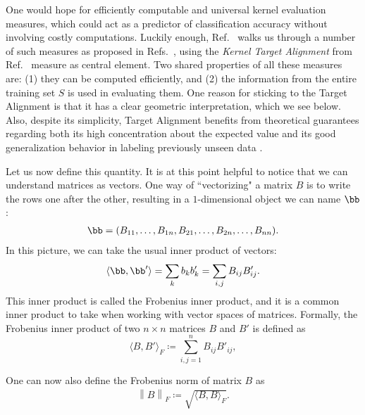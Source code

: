 \documentclass[twocolumn,superscriptaddress,nofootinbib]{revtex4-2}
\newcommand{\Norm}[1]{\left\lVert #1 \right\rVert}
\begin{document}
    One would hope for efficiently computable and universal kernel evaluation measures, which could act as a predictor of classification accuracy without involving costly computations.
    Luckily enough, Ref.~\cite{wangOverviewKernelAlignment2015} walks us through a number of such measures as proposed in  Refs.~\cite{cortes2012CenteredAlignment, baramLearningPolarization, wang2009LocalKernelPolarization, Wang2008KernelClassSeparability, xiong2005EmpiricalFeatureSpace, nguyen2008kernelmatrixevaluationmeasure}, using the \emph{Kernel Target Alignment} from Ref.~\cite{cristianiniKernelTargetAlignment2006} measure as central element.
    Two shared properties of all these measures are: (1) they can be computed efficiently, and (2) the information from the entire training set $S$ is used in evaluating them.
    One reason for sticking to the Target Alignment is that it has a clear geometric interpretation, which we see below.
    Also, despite its simplicity, Target Alignment benefits from theoretical guarantees regarding both its high concentration about the expected value and its good generalization behavior in labeling previously unseen data \cite{cristianiniKernelTargetAlignment2006, kandola2002optimizingalignmentcombinations,nguyen2008kernelmatrixevaluationmeasure}.
    
    Let us now define this quantity.
    It is at this point helpful to notice that we can understand matrices as vectors.
    One way of ``vectorizing" a matrix $B$ is to write the rows one after the other, resulting in a $1$-dimensional object we can name $\bb$:
    \begin{align}
        \bb = (B_{11},\ldots,B_{1n},B_{21},\ldots,B_{2n},\ldots,B_{nn}).
    \end{align}
    In this picture, we can take the usual inner product of vectors:
    \begin{align}
        \langle\bb,\bb'\rangle = \sum_k b_k b'_k = \sum_{i,j} B_{ij}B'_{ij}.
    \end{align}
    This inner product is called the Frobenius inner product, and it is a common inner product to take when working with vector spaces of matrices.
    Formally, the Frobenius inner product of two $n\times n$ matrices $B$ and $B'$ is defined as
    \begin{equation}
        \langle {B,B'} \rangle_F \coloneqq \sum_{i,j=1}^n B_{ij} B'_{ij},
    \end{equation}
    
    One can now also define the Frobenius norm of matrix $B$ as
    \begin{align}
        \Norm{B}_F \coloneqq \sqrt{\langle B,B\rangle_F}.
    \end{align}
    
\end{document}
